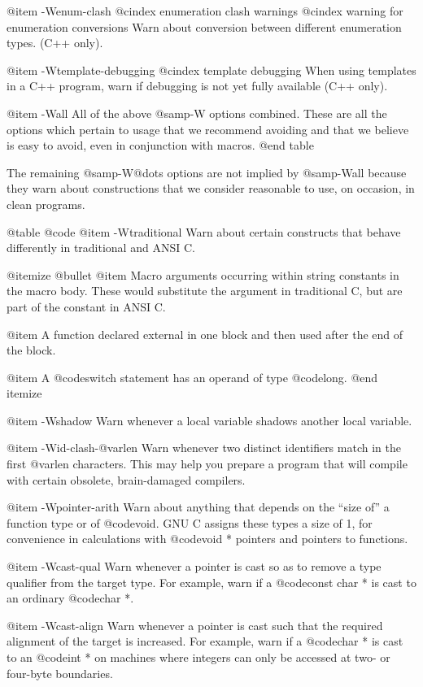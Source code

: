 {@item -Wenum-clash
@cindex enumeration clash warnings
@cindex warning for enumeration conversions
Warn about conversion between different enumeration types.
(C++ only).

@item -Wtemplate-debugging
@cindex template debugging
When using templates in a C++ program, warn if debugging is not yet
fully available (C++ only).

@item -Wall
All of the above @samp{-W} options combined.  These are all the
options which pertain to usage that we recommend avoiding and that we
believe is easy to avoid, even in conjunction with macros.
@end table

The remaining @samp{-W@dots{}} options are not implied by @samp{-Wall}
because they warn about constructions that we consider reasonable to
use, on occasion, in clean programs.

@table @code
@item -Wtraditional
Warn about certain constructs that behave differently in traditional and
ANSI C.

@itemize @bullet
@item
Macro arguments occurring within string constants in the macro body.
These would substitute the argument in traditional C, but are part of
the constant in ANSI C.

@item
A function declared external in one block and then used after the end of
the block.

@item
A @code{switch} statement has an operand of type @code{long}.
@end itemize

@item -Wshadow
Warn whenever a local variable shadows another local variable.

@item -Wid-clash-@var{len}
Warn whenever two distinct identifiers match in the first @var{len}
characters.  This may help you prepare a program that will compile
with certain obsolete, brain-damaged compilers.

@item -Wpointer-arith
Warn about anything that depends on the ``size of'' a function type or
of @code{void}.  GNU C assigns these types a size of 1, for
convenience in calculations with @code{void *} pointers and pointers
to functions.

@item -Wcast-qual
Warn whenever a pointer is cast so as to remove a type qualifier from
the target type.  For example, warn if a @code{const char *} is cast
to an ordinary @code{char *}.

@item -Wcast-align
Warn whenever a pointer is cast such that the required alignment of the
target is increased.  For example, warn if a @code{char *} is cast to
an @code{int *} on machines where integers can only be accessed at
two- or four-byte boundaries.

}

